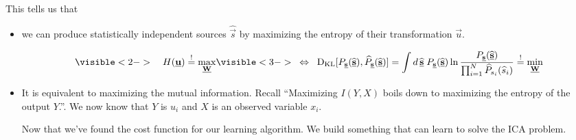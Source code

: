 \begin{frame}


\pause

This tells us that 
\begin{itemize}
\item we can produce statistically independent sources $\widehat {\vec s}$ 
by maximizing the entropy of their transformation $\vec u$.

\begingroup
\footnotesize
\begin{equation}
\label{eq:klminequivh}
\visible<2->{
 \quad H(\vec u) \eqexcl \max_{\vec W} 
 }
 \visible<3->{
  \;\; \Leftrightarrow \;\;
 	\dkl\lbrack P_{\vec{s}}(\widehat{\vec{s}}),\widehat{P}_{\vec{s}}(\widehat{\vec{s}})\rbrack = 
    \int d \, \widehat{\vec{s}} \; P_{\vec{s}}(\widehat{\vec{s}})
		\ln \frac{P_{\vec{s}}(\widehat{\vec{s}})}{
			\prod_{i = 1}^N \widehat{P}_{s_i}(\widehat{s}_i) }
		\eqexcl \min_{\vec{W}} 
 }
\end{equation}
\endgroup
\pause

\item It is equivalent to maximizing the mutual information.
Recall ``Maximizing $I(Y,X)$ boils down to maximizing the entropy of the output $Y$.''.
We now know that $Y$ is $u_i$ and $X$ is an observed variable $x_i$.

\pause

Now that we've found the cost function for our learning algorithm. 
We build something that can learn to solve the ICA problem.

\end{itemize}

\end{frame}

